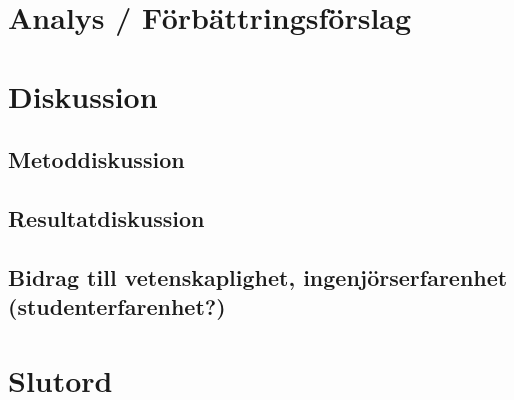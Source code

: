 \documentclass[conference,a4paper]{IEEEtran}
\begin{document}
\section{Analys / Förbättringsförslag} \label{sec:analys}

\section{Diskussion} \label{sec:disk}

\subsection{Metoddiskussion}

\subsection{Resultatdiskussion}

\subsection{Bidrag till vetenskaplighet, ingenjörserfarenhet (studenterfarenhet?)}

\section{Slutord} \label{sec:slutord}



%
%
%

\end{document}
